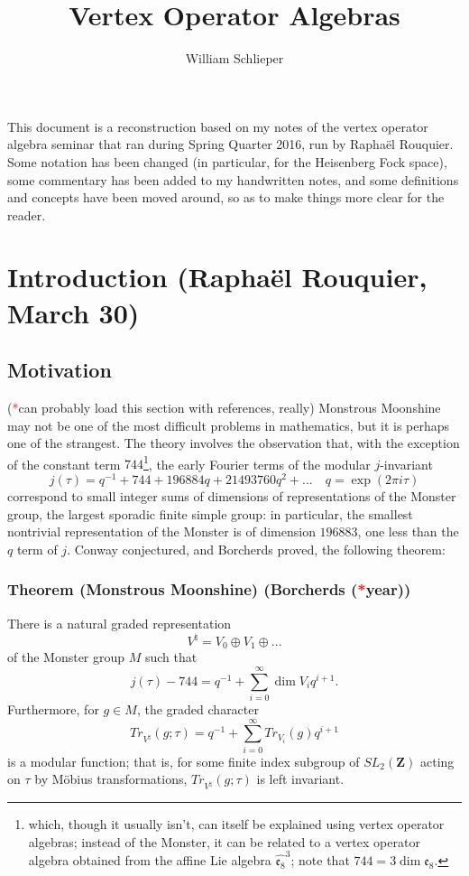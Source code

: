 \documentclass{article}
\author{William Schlieper}
\title{Vertex Operator Algebras}
\newcommand{\ZZ}{\mathbold{Z}}
\newcommand{\tk}{\textcolor{red}{*}}
\begin{document}
\maketitle
This document is a reconstruction based on my notes of the vertex operator algebra seminar
that ran during Spring Quarter 2016, run by Raphaël Rouquier.  Some notation has been changed (in particular, for the Heisenberg Fock space), some commentary has been added to my handwritten notes, and some definitions and concepts have been moved around, so as to make things more clear for the reader.

\tableofcontents

\section{Introduction (Raphaël Rouquier, March 30)}
\label{sec:intro}

\subsection{Motivation}
\label{sec:mot}
(\tk can probably load this section with references, really)
Monstrous Moonshine may not be one of the most difficult problems in mathematics, but it is perhaps one of the strangest.  The theory involves the observation that, with the exception of the constant term $744$\footnote{which, though it usually isn't, can itself be explained using vertex operator algebras; instead of the Monster, it can be related to a vertex operator algebra obtained from the affine Lie algebra $\widehat{\mathfrak{e}_8}^3$; note that $744=3 \dim \mathfrak{e}_8$.}, the early Fourier terms of the modular $j$-invariant
\[j(\tau)=q^{-1}+744+196884q+21493760q^2+... \quad q=\exp(2 \pi i \tau)\]
correspond to small integer sums of dimensions of representations of the Monster group, the largest sporadic finite simple group: in particular, the smallest nontrivial representation of the Monster is of dimension $196883$, one less than the $q$ term of $j$.  Conway conjectured, and Borcherds proved, the following theorem:
\subsubsection{Theorem (Monstrous Moonshine) (Borcherds (\tk year))}
\label{sec:monmoon}
There is a natural graded representation
\[V^\natural = V_0 \oplus V_1 \oplus ... \]
of the Monster group $M$ such that
\[j(\tau)-744=q^{-1}+\sum_{i=0}^{\infty} \dim V_i q^{i+1}. \]
Furthermore, for $g \in M$, the graded character
\[Tr_{V^\natural}(g;\tau)=q^{-1}+\sum_{i=0}^{\infty} Tr_{V_i}(g) q^{i+1} \]
is a modular function; that is, for some finite index subgroup of $SL_2(\ZZ)$ acting on $\tau$ by Möbius transformations, $Tr_{V^\natural}(g;\tau)$ is left invariant.
\end{document}
